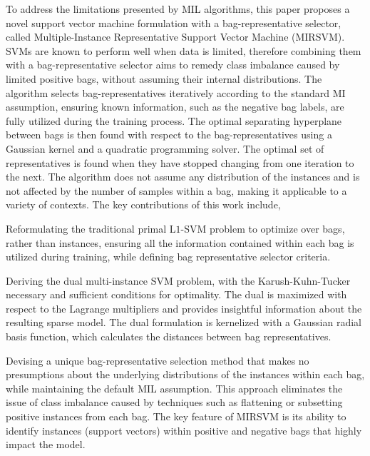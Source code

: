 To address the limitations presented by MIL algorithms, this paper proposes a novel support vector machine formulation with a bag-representative selector, called Multiple-Instance Representative Support Vector Machine (MIRSVM). SVMs are known to perform well when data is limited, therefore combining them with a bag-representative selector aims to remedy class imbalance caused by limited positive bags, without assuming their internal distributions. The algorithm selects bag-representatives iteratively according to the standard MI assumption, ensuring known information, such as the negative bag labels, are fully utilized during the training process. The optimal separating hyperplane between bags is then found with respect to the bag-representatives using a Gaussian kernel and a quadratic programming solver. The optimal set of representatives is found when they have stopped changing from one iteration to the next. The algorithm does not assume any distribution of the instances and is not affected by the number of samples within a bag, making it applicable to a variety of contexts. The key contributions of this work include,
\begin{itemize}
\iitem Reformulating the traditional primal L$1$-SVM problem to optimize over bags, rather than instances, ensuring all the information contained within each bag is utilized during training, while defining bag representative selector criteria.

\iitem Deriving the dual multi-instance SVM problem, with the Karush-Kuhn-Tucker necessary and sufficient conditions for optimality. The dual is maximized with respect to the Lagrange multipliers and provides insightful information about the resulting sparse model. The dual formulation is kernelized with a Gaussian radial basis function, which calculates the distances between bag representatives.

\iitem Devising a unique bag-representative selection method that makes no presumptions about the underlying distributions of the instances within each bag, while maintaining the default MIL assumption. This approach eliminates the issue of class imbalance caused by techniques such as flattening or subsetting positive instances from each bag. The key feature of MIRSVM is its ability to identify instances (support vectors) within positive and negative bags that highly impact the model.
\end{itemize}

